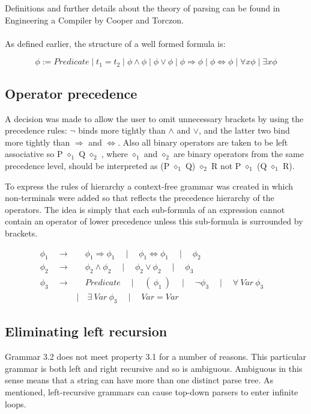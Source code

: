 \noindent Definitions and further details about the theory of parsing can be found in Engineering a Compiler by Cooper and Torczon. \cite{cooper2011engineering}\\
\\
\noindent As defined earlier, the structure of a well formed formula is: 

$$ \phi := Predicate \mid t_1 = t_2 \mid \phi \land \phi \mid \phi \lor \phi \mid \phi \Rightarrow \phi \mid \phi \Leftrightarrow \phi \mid \forall x \phi \mid \exists x \phi$$


\subsection{Operator precedence}

A decision was made to allow the user to omit unnecessary brackets by using the precedence rules: $\lnot$ binds more tightly than $\land$ and $\lor$, and the latter two bind more tightly than $\Rightarrow$ and $\Leftrightarrow$. Also all binary operators are taken to be left associative so P $\diamond_1$ Q $\diamond_2$ , where $\diamond_1$ and $\diamond_2$ are binary operators from the same precedence level, should be interpreted as (P $\diamond_1$ Q) $\diamond_2$ R not P $\diamond_1$ (Q $\diamond_1$ R).  

To express the rules of hierarchy a context-free grammar was created  in which non-terminals were added so that reflects the precedence hierarchy of the operators. The idea is simply that each sub-formula of an expression cannot contain an operator of lower precedence unless this sub-formula is surrounded by brackets. 

\begin{equation}
\begin{aligned}
\phi_1 \quad \to& \quad \phi_1 \Rightarrow \phi_1 \quad
\mid \quad \phi_1 \Leftrightarrow \phi_1 \quad
\mid \quad \phi_2
\\
\phi_2 \quad \to& \quad \phi_2 \land \phi_2 \quad 
\mid \quad \phi_2 \lor \phi_2 \quad 
\mid \quad \phi_3 
\\
\phi_3 \quad \to& \quad Predicate \quad
\mid \quad ( \: \phi_1 \: ) \quad
\mid \quad \lnot \phi_3 \quad
\mid \quad \forall \: Var \: \phi_3 \quad
\\ &\mid \quad \exists \: Var \:\phi_3 \quad
\mid \quad Var = Var 
\end{aligned}
\end{equation}
\subsection{Eliminating left recursion}
Grammar 3.2 does not meet property 3.1 for a number of reasons. This particular grammar is both left and right recursive and so is ambiguous. Ambiguous in this sense means that a string can  have more than one distinct parse tree. As mentioned, left-recursive grammars can cause  top-down parsers to enter infinite loops.

